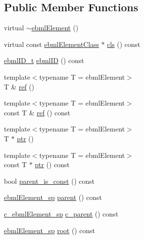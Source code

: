 \subsection*{Public Member Functions}
\begin{DoxyCompactItemize}
\item 
virtual \mbox{\hyperlink{classebml_1_1ebmlElement_a2098d59a92f38d5ab5dbad0c7611115a}{$\sim$ebml\+Element}} ()
\item 
virtual const \mbox{\hyperlink{classebml_1_1ebmlElementClass}{ebml\+Element\+Class}} $\ast$ \mbox{\hyperlink{classebml_1_1ebmlElement_a15cf59e94b01e2c49ec96512b9bd9d90}{cls}} () const
\item 
\mbox{\hyperlink{namespaceebml_a86c5f604ddf12a74aa9812e997a58691}{ebml\+I\+D\+\_\+t}} \mbox{\hyperlink{classebml_1_1ebmlElement_afb2aa40757e663892d3a079de0f4e7d6}{ebml\+ID}} () const
\item 
{\footnotesize template$<$typename T  = ebml\+Element$>$ }\\T \& \mbox{\hyperlink{classebml_1_1ebmlElement_a445d4f6f882750005167411c4f7f24bf}{ref}} ()
\item 
{\footnotesize template$<$typename T  = ebml\+Element$>$ }\\const T \& \mbox{\hyperlink{classebml_1_1ebmlElement_aa2679e147ba5fdf83a0da3efd090593f}{ref}} () const
\item 
{\footnotesize template$<$typename T  = ebml\+Element$>$ }\\T $\ast$ \mbox{\hyperlink{classebml_1_1ebmlElement_a974c7505c6847f3e7411cbe7dbc91f50}{ptr}} ()
\item 
{\footnotesize template$<$typename T  = ebml\+Element$>$ }\\const T $\ast$ \mbox{\hyperlink{classebml_1_1ebmlElement_a22297ffc67936033818a65c89f3564c0}{ptr}} () const
\item 
bool \mbox{\hyperlink{classebml_1_1ebmlElement_a2284de40bfd5b67a7668066a0f816296}{parent\+\_\+is\+\_\+const}} () const
\item 
\mbox{\hyperlink{namespaceebml_adad533b7705a16bb360fe56380c5e7be}{ebml\+Element\+\_\+sp}} \mbox{\hyperlink{classebml_1_1ebmlElement_a7b47b4c43f09c62f56ba326b906fe718}{parent}} () const
\item 
\mbox{\hyperlink{namespaceebml_a2deef4e8071531b32e3533f1bf978917}{c\+\_\+ebml\+Element\+\_\+sp}} \mbox{\hyperlink{classebml_1_1ebmlElement_a1254e41a77ff0157b76db8f33ad7d229}{c\+\_\+parent}} () const
\item 
\mbox{\hyperlink{namespaceebml_adad533b7705a16bb360fe56380c5e7be}{ebml\+Element\+\_\+sp}} \mbox{\hyperlink{classebml_1_1ebmlElement_a9c9ed1823c036c8a77a64c68e12e769f}{root}} () const

\end{DoxyCompactItemize}
